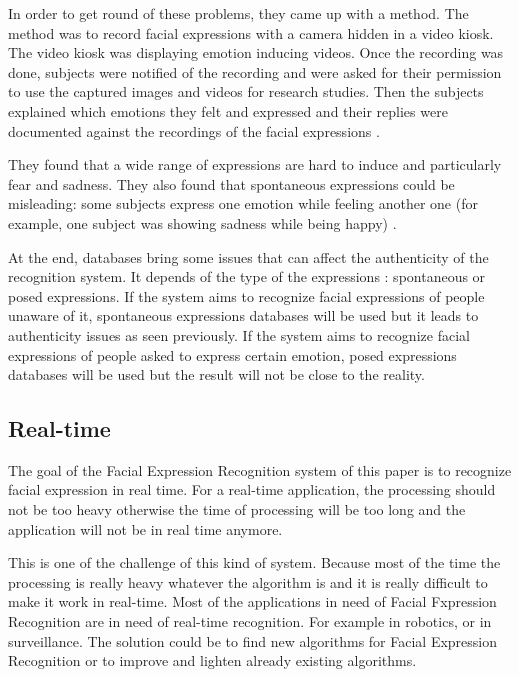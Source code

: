 \vspace{\baselineskip}
\noindent In order to get round of these problems, they came up with a method. The method was to record facial expressions with a camera hidden in a video kiosk. The video kiosk was displaying emotion inducing videos. Once the recording was done, subjects were notified of the recording and were asked for their permission to use the captured images and videos for research studies. Then the subjects explained which emotions they felt and expressed and their replies were documented against the recordings of the facial expressions \cite{SEB07}.
\newline

\noindent They found that a wide range of expressions are hard to induce and particularly fear and sadness. They also found that spontaneous expressions could be misleading: some subjects express one emotion while feeling another one (for example, one subject was showing sadness while being happy) \cite{SEB07}.
\newline

\noindent At the end, databases bring some issues that can affect the authenticity of the recognition system. It depends of the type of the expressions : spontaneous or posed expressions. If the system aims to recognize facial expressions of people unaware of it, spontaneous expressions databases will be used but it leads to authenticity issues as seen previously. If the system aims to recognize facial expressions of people asked to express certain emotion, posed expressions databases will be used but the result will not be close to the reality.
\newline

\subsection{Real-time}

\vspace{\baselineskip}
\noindent The goal of the Facial Expression Recognition system of this paper is to recognize facial expression in real time. For a real-time application, the processing should not be too heavy otherwise the time of processing will be too long and the application will not be in real time anymore. 
\newline

\noindent This is one of the challenge of this kind of system. Because most of the time the processing is really heavy whatever the algorithm is and it is really difficult to make it work in real-time. Most of the applications in need of Facial Fxpression Recognition are in need of real-time recognition. For example in robotics, or in surveillance. The solution could be to find new algorithms for Facial Expression Recognition or to improve and lighten already existing algorithms.
\newline

